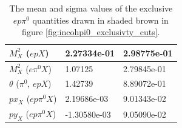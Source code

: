 \begin{itemize}
\begin {table}[!h]
\begin{center}
\begin{tabular}{|l|l|l|}
\hline
$M^{2}_{X}$ ($epX$) & 2.27334e-01  & 2.98775e-01\\
\hline
$M^{2}_{X}$ ($e\pi^{0} X$) & 1.07125  & 2.79845e-01\\
\hline
$\theta$ ($\pi^{0}$, $epX$) &  1.42739 & 8.89072e-01 \\
\hline
$px_{X}$ ($ep\pi^{0} X$) &  2.19686e-03  & 9.01343e-02 \\
\hline
$py_{X}$ ($ep\pi^{0} X$) &  -1.30580e-03 & 9.05090e-02  \\ 
\hline
\end{tabular}
\caption{ The mean and sigma values of the exclusive $ep\pi^{0}$ quantities 
drawn in shaded brown in figure \ref{fig:incohpi0_exclusivty_cuts}.}
\label{Table:incohpi0_exclusivity_cuts}
\end{center}
\end{table}
\end{itemize}



